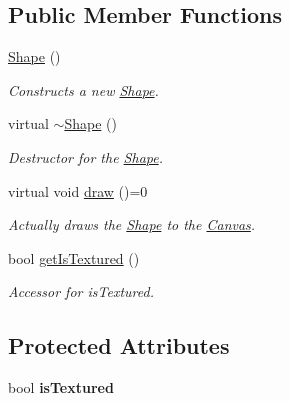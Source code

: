 \subsection*{Public Member Functions}
\begin{DoxyCompactItemize}
\item 
\hyperlink{classtsgl_1_1_shape_ad283a47aa40bf80dcd308cc581c9e2dd}{Shape} ()
\begin{DoxyCompactList}\small\item\em Constructs a new \hyperlink{classtsgl_1_1_shape}{Shape}. \end{DoxyCompactList}\item 
\hypertarget{classtsgl_1_1_shape_aa9bfac883a0748471600fe9752e85948}{virtual \hyperlink{classtsgl_1_1_shape_aa9bfac883a0748471600fe9752e85948}{$\sim$\-Shape} ()}\label{classtsgl_1_1_shape_aa9bfac883a0748471600fe9752e85948}

\begin{DoxyCompactList}\small\item\em Destructor for the \hyperlink{classtsgl_1_1_shape}{Shape}. \end{DoxyCompactList}\item 
virtual void \hyperlink{classtsgl_1_1_shape_af78b1627b97d621824ce86db214e2402}{draw} ()=0
\begin{DoxyCompactList}\small\item\em Actually draws the \hyperlink{classtsgl_1_1_shape}{Shape} to the \hyperlink{classtsgl_1_1_canvas}{Canvas}. \end{DoxyCompactList}\item 
bool \hyperlink{classtsgl_1_1_shape_aadd0ea81f714328bdf9483851a8b86ad}{get\-Is\-Textured} ()
\begin{DoxyCompactList}\small\item\em Accessor for {\ttfamily is\-Textured}. \end{DoxyCompactList}\end{DoxyCompactItemize}
\subsection*{Protected Attributes}
\begin{DoxyCompactItemize}
\item 
\hypertarget{classtsgl_1_1_shape_a9d5cd6d6a0596a30dbce44eb2d00c583}{bool {\bfseries is\-Textured}}\label{classtsgl_1_1_shape_a9d5cd6d6a0596a30dbce44eb2d00c583}

\end{DoxyCompactItemize}


